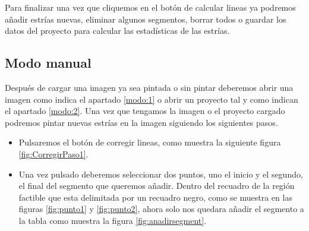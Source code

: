\documentclass[13pt]{book}              %
\begin{document}
{Para finalizar una vez que cliquemos en el botón de calcular lineas ya podremos añadir estrías nuevas, eliminar algunos segmentos, borrar todos o guardar los datos del proyecto para calcular las estadísticas de las estrías.


\subsection{Modo manual}
Después de cargar una imagen ya sea pintada o sin pintar deberemos abrir una imagen como indica el apartado \ref{modo:1} o abrir un proyecto tal y como indican el apartado \ref{modo:2}.
Una vez que tengamos la imagen o el proyecto cargado podremos pintar nuevas estrías en la imagen siguiendo los siguientes pasos.

\begin{itemize}
\item Pulsaremos el botón de corregir lineas, como muestra la siguiente figura \ref{fig:CorregirPaso1}.

\item Una vez pulsado deberemos seleccionar dos puntos, uno el inicio y el segundo, el final del segmento que queremos añadir. 
Dentro del recuadro de la región factible que esta delimitada por un recuadro negro, como se muestra en las figuras \ref{fig:punto1} y \ref{fig:punto2}, ahora solo nos quedara añadir el segmento a la tabla como muestra la figura \ref{fig:anadirsegment}.
\end{itemize}

}
\end{document}
